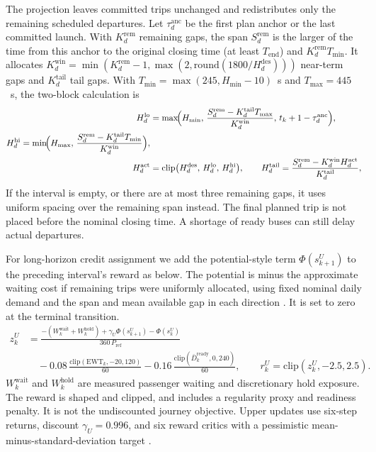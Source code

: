 The projection leaves committed trips unchanged and redistributes only the remaining scheduled departures. Let $\tau^{\mathrm{anc}}_d$ be the first plan anchor or the last committed launch. With $K^{\mathrm{rem}}_d$ remaining gaps, the span $S^{\mathrm{rem}}_d$ is the larger of the time from this anchor to the original closing time (at least $T_{\mathrm{end}}$) and $K^{\mathrm{rem}}_d T_{\min}$. It allocates $K^{\mathrm{win}}_d=\min(K^{\mathrm{rem}}_d-1,\max(2,\mathrm{round}(1800/H^{\mathrm{des}}_d)))$ near-term gaps and $K^{\mathrm{tail}}_d$ tail gaps. With $T_{\min}=\max(245,H_{\min}-10)$~s and $T_{\max}=445$~s, the two-block calculation is
\begin{equation}
  \begin{aligned}
  H^{\mathrm{lo}}_d &= \max\!\Bigl(H_{\min},\, \frac{S^{\mathrm{rem}}_d - K^{\mathrm{tail}}_d T_{\max}}{K^{\mathrm{win}}_d},\, t_k + 1 - \tau^{\mathrm{anc}}_d\Bigr), \\
  H^{\mathrm{hi}}_d = \min\!\Bigl(H_{\max},\, \frac{S^{\mathrm{rem}}_d - K^{\mathrm{tail}}_d T_{\min}}{K^{\mathrm{win}}_d}\Bigr), \\
  H^{\mathrm{act}}_d &= \mathrm{clip}\bigl(H^{\mathrm{des}}_d,\, H^{\mathrm{lo}}_d,\, H^{\mathrm{hi}}_d\bigr), \qquad
  H^{\mathrm{tail}}_d = \frac{S^{\mathrm{rem}}_d - K^{\mathrm{win}}_d H^{\mathrm{act}}_d}{K^{\mathrm{tail}}_d},
  \end{aligned}
  \label{eq:quota_projection}
\end{equation}
If the interval is empty, or there are at most three remaining gaps, it uses uniform spacing over the remaining span instead. The final planned trip is not placed before the nominal closing time. A shortage of ready buses can still delay actual departures.

For long-horizon credit assignment we add the potential-style term $\Phi(s^U_{k+1})$ to the preceding interval's reward as below. The potential is minus the approximate waiting cost if remaining trips were uniformly allocated, using fixed nominal daily demand and the span and mean available gap in each direction \citep{newell1971dispatching}. It is set to zero at the terminal transition.
\begin{equation}
  \begin{aligned}
  z^U_k &= \frac{-(W^{\mathrm{wait}}_k + W^{\mathrm{hold}}_k) + \gamma_U \Phi(s^U_{k+1}) - \Phi(s^U_k)}{360\,P_{\mathrm{ref}}} \\
        &\quad - 0.08\,\frac{\mathrm{clip}(\mathrm{EWT}_k, -20, 120)}{60}
               - 0.16\,\frac{\mathrm{clip}(\bar{D}^{\mathrm{ready}}_k, 0, 240)}{60}, \qquad
  r^U_k=\mathrm{clip}(z^U_k,-2.5,2.5).
  \end{aligned}
  \label{eq:upper_reward}
\end{equation}
$W^{\mathrm{wait}}_k$ and $W^{\mathrm{hold}}_k$ are measured passenger waiting and discretionary hold exposure. The reward is shaped and clipped, and includes a regularity proxy and readiness penalty. It is not the undiscounted journey objective. Upper updates use six-step returns, discount $\gamma_U=0.996$, and six reward critics with a pessimistic mean-minus-standard-deviation target \citep{haarnoja2018soft,christodoulou2019discrete,chen2021redq}.

